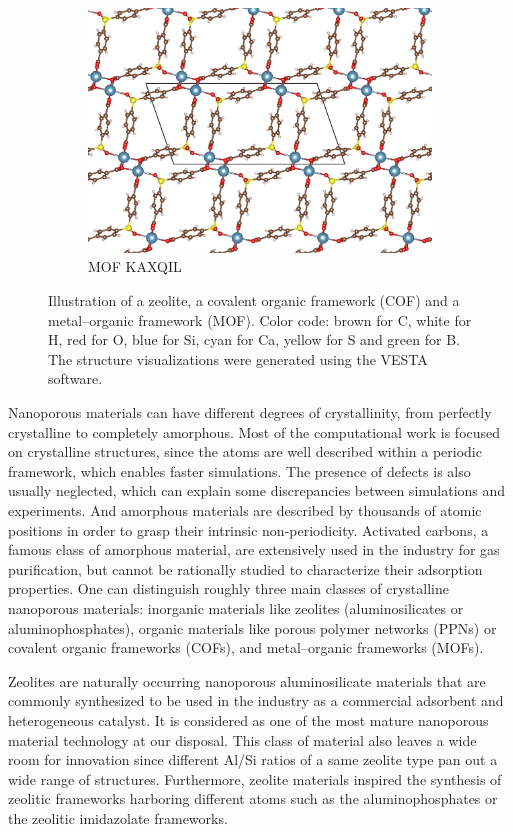 \documentclass[main.tex]{subfiles}
\begin{document}
\begin{figure}[ht]
\begin{subfigure}[b]{0.32\textwidth}
    \includegraphics[height=0.7\textwidth]{figures/1-screening/SBMOF-1.jpg}
    \caption{MOF KAXQIL~\cite{KAXQIL}}
  \end{subfigure}
  \caption{Illustration of a zeolite, a covalent organic framework (COF) and a metal--organic framework (MOF). Color code: brown for C, white for H, red for O, blue for Si, cyan for Ca, yellow for S and green for B. The structure visualizations were generated using the VESTA software.\autocite{VESTA}}
\end{figure}

Nanoporous materials can have different degrees of crystallinity, from perfectly crystalline to completely amorphous. Most of the computational work is focused on crystalline structures, since the atoms are well described within a periodic framework, which enables faster simulations. The presence of defects is also usually neglected, which can explain some discrepancies between simulations and experiments. And amorphous materials are described by thousands of atomic positions in order to grasp their intrinsic non-periodicity.\autocite{Thyagarajan_2020} Activated carbons, a famous class of amorphous material, are extensively used in the industry for gas purification, but cannot be rationally studied to characterize their adsorption properties. One can distinguish roughly three main classes of crystalline nanoporous materials: inorganic materials like zeolites (aluminosilicates or aluminophosphates), organic materials like porous polymer networks (PPNs) or covalent organic frameworks (COFs), and metal--organic frameworks (MOFs).

Zeolites are naturally occurring nanoporous aluminosilicate materials that are commonly synthesized to be used in the industry as a commercial adsorbent and heterogeneous catalyst.\autocite{Ozin_1989,Ma_2000} It is considered as one of the most mature nanoporous material technology at our disposal. This class of material also leaves a wide room for innovation since different Al/Si ratios of a same zeolite type pan out a wide range of structures. Furthermore, zeolite materials inspired the synthesis of zeolitic frameworks harboring different atoms such as the aluminophosphates or the zeolitic imidazolate frameworks.\autocite{Wang_2012,Chen_2014_zeo} 
\end{document}
